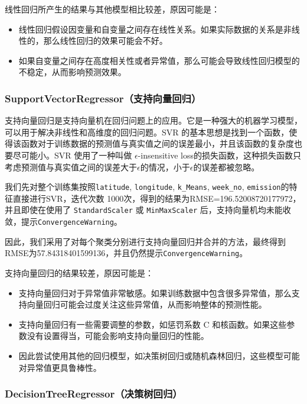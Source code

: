 \documentclass{ctexart}
\begin{document}
\begin{sloppypar}
线性回归所产生的结果与其他模型相比较差，原因可能是：

\begin{itemize}
      \item 线性回归假设因变量和自变量之间存在线性关系。如果实际数据的关系是非线性的，那么线性回归的效果可能会不好。
      \item 如果自变量之间存在高度相关性或者异常值，那么可能会导致线性回归模型的不稳定，从而影响预测效果。
\end{itemize}

\subsubsection{SupportVectorRegressor（支持向量回归）}

支持向量回归是支持向量机在回归问题上的应用。它是一种强大的机器学习模型，可以用于解决非线性和高维度的回归问题。SVR 的基本思想是找到一个函数，使得该函数对于训练数据的预测值与真实值之间的误差最小，并且该函数的复杂度也要尽可能小。SVR 使用了一种叫做 $\epsilon$-insensitive loss的损失函数，这种损失函数只考虑预测值与真实值之间的误差大于$\epsilon$的情况，小于$\epsilon$的误差都被忽略。

我们先对整个训练集按照\texttt{latitude}, \texttt{longitude}, \texttt{k\_Means}, \texttt{week\_no}, \texttt{emission}的特征直接进行SVR，迭代次数 1000次，得到的结果为RMSE=196.52008720177972，并且即使在使用了 \texttt{StandardScaler} 或 \texttt{MinMaxScaler} 后，支持向量机均未能收敛，提示\texttt{ConvergenceWarning}。

因此，我们采用了对每个聚类分别进行支持向量回归并合并的方法，最终得到RMSE为57.84318401599136，并且仍然提示\texttt{ConvergenceWarning}。

支持向量回归的结果较差，原因可能是：

\begin{itemize}
      \item 支持向量回归对于异常值非常敏感。如果训练数据中包含很多异常值，那么支持向量回归可能会过度关注这些异常值，从而影响整体的预测性能。
      \item 支持向量回归有一些需要调整的参数，如惩罚系数 C 和核函数。如果这些参数没有设置得当，可能会影响支持向量回归的性能。
      \item 因此尝试使用其他的回归模型，如决策树回归或随机森林回归，这些模型可能对异常值更具鲁棒性。
\end{itemize}

\subsubsection{DecisionTreeRegressor（决策树回归）}


\end{sloppypar}
\end{document}
